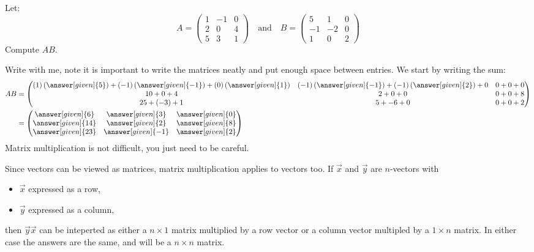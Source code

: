 \documentclass{ximera}
\begin{document}
\begin{example}
  Let:
  \[
  A = \begin{pmatrix}
    1 & -1 & 0\\
    2 & 0 & 4 \\
    5 & 3 & 1
  \end{pmatrix}
  \quad\text{and}\quad B =
  \begin{pmatrix}
    5 & 1 & 0\\
    -1 & -2 & 0\\
    1 & 0 & 2
  \end{pmatrix}
  \]
  Compute $AB$.
  \begin{explanation}
    Write with me, note it is important to write the matrices neatly
    and put enough space between entries. We start by writing the sum:
    \begin{align*}
      AB &= \begin{pmatrix}
        (1)\left(\answer[given]{5}\right) + (-1)\left(\answer[given]{-1}\right)+ (0)\left(\answer[given]{1}\right) & (-1)\left(\answer[given]{-1}\right) + (-1)\left(\answer[given]{2}\right)+ 0 & 0 + 0+ 0\\
        10 + 0 + 4 & 2 + 0+0 & 0 + 0+8\\
        25+ (-3) + 1 & 5 + -6+0 & 0 + 0+ 2
      \end{pmatrix}\\ 
      &= \begin{pmatrix}
        \answer[given]{6} &  \answer[given]{3} &  \answer[given]{0}\\
         \answer[given]{14}&  \answer[given]{2} &  \answer[given]{8}\\
         \answer[given]{23} &  \answer[given]{-1} &  \answer[given]{2}
      \end{pmatrix}
    \end{align*}
    Matrix multiplication is not difficult, you just need to be
    careful.
  \end{explanation}
\end{example}




Since vectors can be viewed as matrices, matrix multiplication applies
to vectors too.  If $\vec{x}$ and $\vec y$ are $n$-vectors with
\begin{itemize}
\item $\vec{x}$ expressed as a row,
\item $\vec{y}$ expressed as a column,
\end{itemize}
then $\vec{y}\vec{x}$ can be inteperted as either a $n\times 1$
matrix multiplied by a row vector or a column vector multipled by a
$1\times n$ matrix. In either case the answers are the same, and will be a $n\times n$ matrix.
\end{document}
